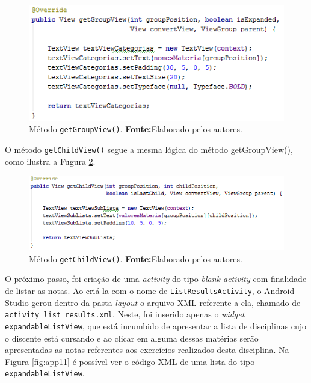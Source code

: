 		\begin{figure}[h!] 
			\centerline{\includegraphics[scale=0.7]{./imagens/2_q_metodologico/4_procedimentos_resultados/42_aplicativo/app9.png}}
			\caption[Método getGroupView()]{Método \texttt{getGroupView()}.
			\textbf{Fonte:}Elaborado pelos autores.}
			\label{fig:app9}
		\end{figure}
	
	\pagebreak
	
	\par O método \texttt{getChildView()} segue a mesma lógica do método
getGroupView(), como ilustra a Fugura \ref{fig:app10}.

		\begin{figure}[h!] 
			\centerline{\includegraphics[scale=0.7]{./imagens/2_q_metodologico/4_procedimentos_resultados/42_aplicativo/app10.png}}
			\caption[Método getChildView()]{Método \texttt{getChildView()}.
			\textbf{Fonte:}Elaborado pelos autores.}
			\label{fig:app10}
		\end{figure}
	
	\par O próximo passo, foi criação de uma \textit{activity} do tipo
\textit{blank activity} com finalidade de listar as notas. Ao criá-la com o
nome de \texttt{ListResultsActivity}, o Android Studio gerou dentro da pasta
\textit{layout} o arquivo XML referente a ela, chamado de
\texttt{activity\_list\_results.xml}. Neste, foi inserido apenas o
\textit{widget}  \texttt{expandableListView}, que está incumbido de apresentar
a lista de disciplinas cujo o discente está cursando e ao clicar em alguma
dessas matérias serão apresentadas as notas referentes aos exercícios
realizados desta disciplina. Na Figura \ref{fig:app11} é possível ver o código
XML de uma lista do tipo \texttt{expandableListView}.

